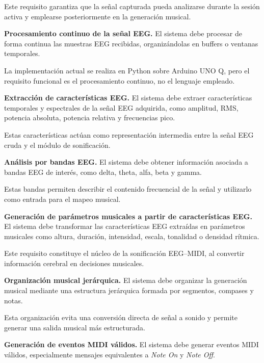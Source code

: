 \documentclass[../main.tex]{subfiles}
\begin{document}
\begin{description}[leftmargin=!,labelwidth=1.8cm]
    Este requisito garantiza que la señal capturada pueda analizarse durante la sesión activa y emplearse posteriormente en la generación musical.

    \item[RF-6] \textbf{Procesamiento continuo de la señal EEG.} El sistema debe procesar de forma continua las muestras EEG recibidas, organizándolas en buffers o ventanas temporales.

    La implementación actual se realiza en Python sobre Arduino UNO Q, pero el requisito funcional es el procesamiento continuo, no el lenguaje empleado.

    \item[RF-7] \textbf{Extracción de características EEG.} El sistema debe extraer características temporales y espectrales de la señal EEG adquirida, como amplitud, RMS, potencia absoluta, potencia relativa y frecuencias pico.

    Estas características actúan como representación intermedia entre la señal EEG cruda y el módulo de sonificación.

    \item[RF-8] \textbf{Análisis por bandas EEG.} El sistema debe obtener información asociada a bandas EEG de interés, como delta, theta, alfa, beta y gamma.

    Estas bandas permiten describir el contenido frecuencial de la señal y utilizarlo como entrada para el mapeo musical.

    \item[RF-9] \textbf{Generación de parámetros musicales a partir de características EEG.} El sistema debe transformar las características EEG extraídas en parámetros musicales como altura, duración, intensidad, escala, tonalidad o densidad rítmica.

    Este requisito constituye el núcleo de la sonificación EEG--MIDI, al convertir información cerebral en decisiones musicales.

    \item[RF-10] \textbf{Organización musical jerárquica.} El sistema debe organizar la generación musical mediante una estructura jerárquica formada por segmentos, compases y notas.

    Esta organización evita una conversión directa de señal a sonido y permite generar una salida musical más estructurada.

    \item[RF-11] \textbf{Generación de eventos MIDI válidos.} El sistema debe generar eventos MIDI válidos, especialmente mensajes equivalentes a \textit{Note On} y \textit{Note Off}.


\end{description}
\end{document}

